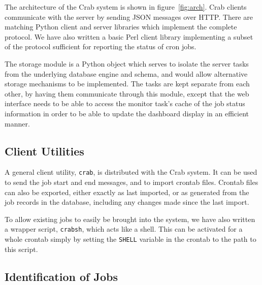 \documentclass[11pt,twoside]{article}
\begin{document}

The architecture of the Crab system is
shown in figure~\ref{fig:arch}.
Crab clients communicate with the server
by sending JSON messages over HTTP.
There are matching Python client and server libraries
which implement the complete protocol.
We have also written a basic Perl client library implementing
a subset of the protocol sufficient for 
reporting the status of cron jobs.

The storage module is a Python object which serves to isolate the
server tasks from the underlying database engine and schema, and would
allow alternative storage mechanisms to be implemented.
The tasks are kept separate from each other, by having them communicate
through this module, except that the web interface needs to be
able to access the monitor task's cache of the job status information
in order to be able to update the dashboard display in
an efficient manner.

\subsection{Client Utilities}


A general client utility, \texttt{crab},
is distributed with the Crab system.
It can be used to send the job start
and end messages, and to import crontab files.
Crontab files can also be exported,
either exactly as last imported,
or as generated from the job records in the database,
including any changes made since the last
import.

To allow existing jobs to easily
be brought into the system,
we have also written a wrapper script, \texttt{crabsh}, which acts
like a shell.
This can be activated for a whole crontab 
simply by setting the \texttt{SHELL}
variable in the crontab to the path to this script.

\subsection{Identification of Jobs}
\end{document}
